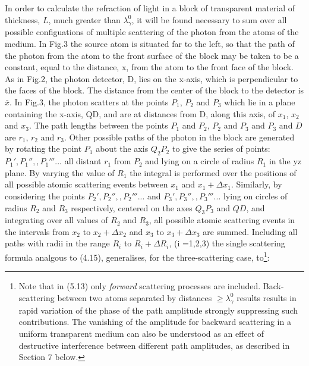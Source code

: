{    \par In order to calculate the
   refraction of light in a block of transparent material of thickness, $L$, much greater than $\lambda_{\gamma}^0$,
   it will be found necessary to sum over all possible configuations of multiple scattering of the
    photon from the atoms of the medium. In Fig.3 the source atom is situated far to the left,
     so that the path of the photon from the atom to the front surface of the block may be taken to
    be a constant, equal to the distance, x, from the atom to the front face of the block.
    As in Fig.2, the photon detector, D, lies on the x-axis, which is perpendicular to the
  faces of the block. The distance from the center of the block to the detector is $\bar{x}$. In 
   Fig.3, the photon scatters at the points $P_1$, $P_2$ and $P_3$ which lie in a plane
  containing the x-axis, QD, and are at distances from D, along this axis, of $x_1$, $x_2$ and $x_3$.
  The path lengths between the points $P_1$ and $P_2$,  $P_2$ and $P_3$ and  $P_3$ and $D$ are
   $r_1$, $r_2$ and $r_3$.
  Other possible paths of the photon in the block are generated by rotating the point $P_1$ 
  about the axis $Q_2 P_2$ to give the series of points: $P_1',P_1'',,P_1'''...$ all distant
  $r_1$ from $P_2$ and lying on a circle of radius $R_1$ in the yz plane. By varying the value
  of $R_1$ the integral is performed over the positions of all possible atomic scattering events 
  between $x_1$ and $x_1+\Delta x_1$. Similarly, by considering the points $P_2',P_2'',,P_2'''...$
   and $P_3',P_3'',,P_3'''...$  lying on circles of radius $R_2$ and $R_3$ respectively, 
  centered on the axes  $Q_3 P_3$ and $Q D$, and integrating over all values of 
  $R_2$ and $R_3$, all possible atomic scattering events in the intervals from  $x_2$ to $x_2+\Delta x_2$ and
   $x_3$ to $x_3+\Delta x_3$ are summed. Including all paths with radii in the range
   $R_i$ to $R_i +\Delta R_i$, (i =1,2,3) the single scattering formula analgous to (4.15),
   generalises, for the three-scattering case, to\footnote{Note that in (5.13) only {\it forward}
   scattering processes are included. Back-scattering between two atoms separated by distances 
   $\ge \lambda_{\gamma}^0$ results results in rapid variation of the phase of the path amplitude
    strongly suppressing such contributions. The vanishing of the amplitude for backward
     scattering in a uniform transparent medium can also be understood as an effect of destructive 
     interference between different path amplitudes, as described in Section 7 below.}:

}
